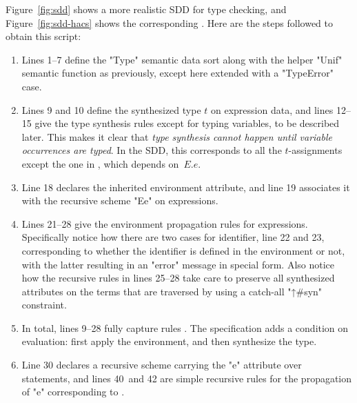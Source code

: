 \documentclass[12pt]{article} %
\begin{document}
\begin{example}
  Figure~\ref{fig:sdd} shows a more realistic SDD for type checking, and Figure~\ref{fig:sdd-hacs}
  shows the corresponding \HAX. Here are the steps followed to obtain this script:
  \begin{enumerate}

  \item Lines 1--7 define the "Type" semantic data sort along with the helper "Unif" semantic
    function as previously, except here extended with a "TypeError" case.

  \item Lines 9 and 10 define the synthesized type $t$ on expression data, and lines 12--15 give the
    type synthesis rules except for typing variables, to be described later. This makes it clear
    that \emph{type synthesis cannot happen until variable occurrences are typed}. In the SDD, this
    corresponds to all the $t$-assignments except the one in , which depends on~$E.e$.

  \item Line 18 declares the inherited environment attribute, and line 19 associates it with the
    recursive scheme "Ee" on expressions.

  \item Lines 21--28 give the environment propagation rules for expressions. Specifically notice how
    there are two cases for identifier, line 22 and 23, corresponding to whether the identifier is
    defined in the environment or not, with the latter resulting in an "error" message in special
    \HAX form. Also notice how the recursive rules in lines 25--28 take care to preserve all
    synthesized attributes on the terms that are traversed by using a catch-all "↑#syn" constraint.

  \item In total, lines 9--28 fully capture rules . The \HAX specification adds a
    condition on evaluation: first apply the environment, and then synthesize the type.

  \item Line 30 declares a recursive scheme carrying the "e" attribute over statements, and lines
    40~and 42 are simple recursive rules for the propagation of "e" corresponding to
    .


\end{enumerate}
\end{example}
\end{document}
